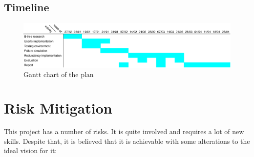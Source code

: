 \subsection{Timeline}

    \begin{figure}[htbp]
    	\centerline{
    		\includegraphics[width=18cm]{gantt}
    	}
    	\caption{Gantt chart of the plan}
    \end{figure}



%
%
\section{Risk Mitigation}

    This project has a number of risks. It is quite involved and requires a lot
    of new skills. Despite that, it is believed that it is achievable with some
    alterations to the ideal vision for it:

